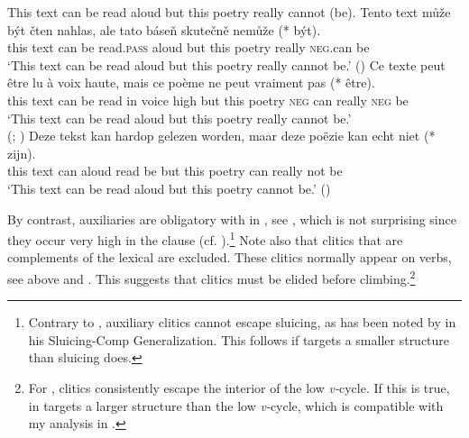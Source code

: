 \documentclass[output=paper,colorlinks,citecolor=brown,]{langsci/langscibook}
\begin{document}
\begin{exe}
\ex \label{27}
\begin{xlist}
\ex \label{27a} This text can be read aloud but this poetry really cannot (be).
\ex \label{27b}
\gll Tento text může být čten nahlas, ale tato báseň  skutečně nemůže (*\hspace{-2pt} být).\\
this text can be read.\textsc{pass} aloud but this poetry really \textsc{neg}.can {} be\\
\glt `This text can be read aloud but this poetry really cannot be.' \hfill ()
\ex \label{27c}
\gll Ce texte peut être lu à voix haute, mais ce poème ne peut vraiment pas (*\hspace{-2pt} être).\\
this text can be read in voice high but this poetry \textsc{neg} can really \textsc{neg} {} be\\
\glt `This text can be read aloud but this poetry really cannot be.' \\ \hfill (; \citealt{Dagnac2010})
\ex \label{27d}
\gll Deze tekst kan hardop gelezen worden, maar deze poëzie kan echt niet (*\hspace{-2pt} zijn).\\
this text can aloud read be but this  poetry can  really not {} be\\
\glt `This text can be read aloud but this poetry cannot be.' \hfill ()
\end{xlist}
\end{exe}

\noindent By contrast,   auxiliaries are obligatory with  in , see , which is not surprising since they occur very high in the clause (cf. ).\footnote{Contrary to , auxiliary clitics cannot escape sluicing, as has been noted by \cite{Merchant2001} in his Sluicing-Comp Generalization. This follows if  targets a smaller structure than sluicing does.} Note also that   clitics that are complements of the lexical  are excluded. These clitics normally appear on  verbs, see  above and . This suggests that  clitics must be elided before  climbing.\footnote{For \cite{Roberts2010},  clitics consistently escape the interior of the low \textit{v-}cycle. If this is true,  in  targets a larger structure than the low \textit{v-}cycle, which is compatible with my analysis in  .}
\end{document}
